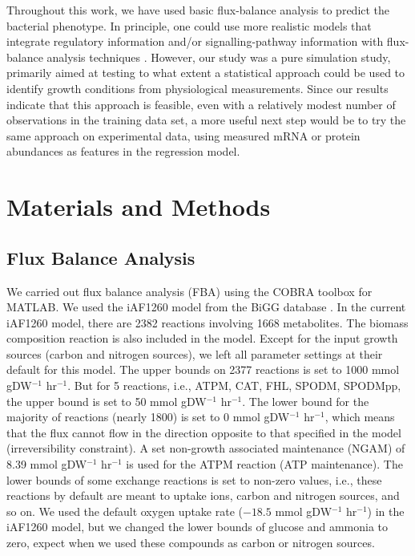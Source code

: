 \documentclass[12pt]{article}
\begin{document}
Throughout this work, we have used basic flux-balance analysis to predict the bacterial phenotype. In principle, one could use more realistic models that integrate regulatory information and/or signalling-pathway information with flux-balance analysis techniques \cite{CovertPalsson2002,Covertetal2008}. However, our study was a pure simulation study, primarily aimed at testing to what extent a statistical approach could be used to identify growth conditions from physiological measurements. Since our results indicate that this approach is feasible, even with a relatively modest number of observations in the training data set, a more useful next step would be to try the same approach on experimental data, using measured mRNA or protein abundances as features in the regression model.


\section*{Materials and Methods}

\subsection*{Flux Balance Analysis} 

We carried out flux balance analysis (FBA) using the COBRA toolbox \cite{Schellenbergeretal2011} for MATLAB. 
We used the iAF1260 model from the BiGG database \cite{Schellenbergeretal2010}. In the current iAF1260 model, there are 2382 reactions involving 1668 metabolites. The biomass composition reaction is also included in the model. Except for the input growth sources (carbon and nitrogen sources), we left all parameter settings at their default for this model. The upper bounds on 2377 reactions is set to 1000  mmol gDW$^{-1}$ hr$^{-1}$. But for 5 reactions, i.e., ATPM, CAT, FHL, SPODM, SPODMpp, the upper bound is set to 50 mmol gDW$^{-1}$ hr$^{-1}$. The lower bound for the majority of reactions (nearly 1800) is set to 0 mmol gDW$^{-1}$ hr$^{-1}$, which means that the flux cannot flow in the direction opposite to that specified in the model (irreversibility constraint). A set non-growth associated maintenance (NGAM) of 8.39  mmol gDW$^{-1}$ hr$^{-1}$ is used for the ATPM reaction (ATP maintenance). The lower bounds of some exchange reactions is set to non-zero values, i.e., these reactions by default are meant to uptake ions, carbon and nitrogen sources, and so on. We used the default oxygen uptake rate ($-18.5$ mmol gDW$^{-1}$ hr$^{-1}$) in the iAF1260 model, but we changed the lower bounds of glucose and ammonia to zero, expect when we used these compounds as carbon or nitrogen sources.
\end{document}
